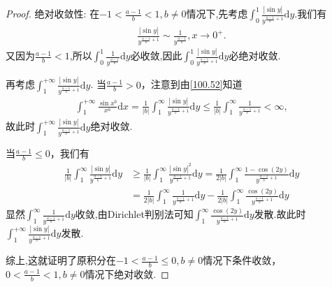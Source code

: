 \documentclass[../../main.tex]{subfiles}
\begin{document}
\begin{proof}
{\heiti 绝对收敛性:} 在\(-1 < \frac{a - 1}{b} < 1, b\neq 0\)情况下,先考虑$\int_0^1{\frac{\left| \sin y \right|}{y^{\frac{a-1}{b}+1}}\mathrm{d}y}$.我们有
\begin{align*}
\frac{\left| \sin y \right|}{y^{\frac{a-1}{b}+1}}\sim \frac{1}{y^{\frac{a-1}{b}}},x\rightarrow 0^+.
\end{align*}
又因为$\frac{a-1}{b}<1$,所以$\int_0^1{\frac{1}{y^{\frac{a-1}{b}}}\mathrm{d}y}$必收敛,因此$\int_0^1{\frac{\left| \sin y \right|}{y^{\frac{a-1}{b}+1}}\mathrm{d}y}$必绝对收敛.

再考虑$\int_{1}^{+\infty}{\frac{\left| \sin y \right|}{y^{\frac{a-1}{b}+1}}\mathrm{d}y}$.
当\(\frac{a - 1}{b}>0\)，注意到由\eqref{100.52}知道
\begin{align*}
\int_{1}^{+\infty}\frac{\sin x^b}{x^a}\mathrm{d}x=\frac{1}{|b|}\int_{1}^{\infty}\frac{|\sin y|}{y^{\frac{a - 1}{b}+1}}\mathrm{d}y \leqslant \frac{1}{|b|}\int_{1}^{\infty}\frac{1}{y^{\frac{a - 1}{b}+1}} < \infty,
\end{align*}
故此时$\int_{1}^{+\infty}{\frac{\left| \sin y \right|}{y^{\frac{a-1}{b}+1}}\mathrm{d}y}$绝对收敛.

当\(\frac{a - 1}{b}\leqslant 0\)，我们有
\begin{align*}
\frac{1}{|b|}\int_{1}^{\infty}\frac{|\sin y|}{y^{\frac{a - 1}{b}+1}}\mathrm{d}y &\geqslant \frac{1}{|b|}\int_{1}^{\infty}\frac{|\sin y|^2}{y^{\frac{a - 1}{b}+1}}\mathrm{d}y = \frac{1}{2|b|}\int_{1}^{\infty}\frac{1 - \cos(2y)}{y^{\frac{a - 1}{b}+1}}\mathrm{d}y \\
&= \frac{1}{2|b|}\int_{1}^{\infty}\frac{1}{y^{\frac{a - 1}{b}+1}}\mathrm{d}y - \frac{1}{2|b|}\int_{1}^{\infty}\frac{\cos(2y)}{y^{\frac{a - 1}{b}+1}}\mathrm{d}y
\end{align*}
显然$\int_{1}^{\infty}\frac{1}{y^{\frac{a - 1}{b}+1}}\mathrm{d}y$收敛,由Dirichlet判别法可知$\int_{1}^{\infty}\frac{\cos(2y)}{y^{\frac{a - 1}{b}+1}}\mathrm{d}y$发散.故此时$\int_{1}^{+\infty}{\frac{\left| \sin y \right|}{y^{\frac{a-1}{b}+1}}\mathrm{d}y}$发散.

综上,这就证明了原积分在\(-1 < \frac{a - 1}{b} \leqslant 0, b\neq 0\)情况下条件收敛，\(0 < \frac{a - 1}{b} < 1, b\neq 0\)情况下绝对收敛. 
\end{proof}
\end{document}
